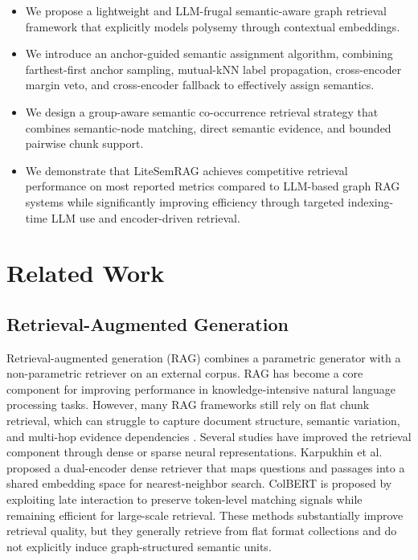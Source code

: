 \documentclass[conference]{IEEEtran}
\begin{document}
\begin{itemize}
    \item We propose a lightweight and LLM-frugal semantic-aware graph retrieval framework that explicitly models polysemy through contextual embeddings.
    \item We introduce an anchor-guided semantic assignment algorithm, combining farthest-first anchor sampling, mutual-kNN label propagation, cross-encoder margin veto, and cross-encoder fallback to effectively assign semantics.
    \item We design a group-aware semantic co-occurrence retrieval strategy that combines semantic-node matching, direct semantic evidence, and bounded pairwise chunk support.
    \item We demonstrate that LiteSemRAG achieves competitive retrieval performance on most reported metrics compared to LLM-based graph RAG systems while significantly improving efficiency through targeted indexing-time LLM use and encoder-driven retrieval.
\end{itemize}


\section{Related Work}

\subsection{Retrieval-Augmented Generation}

Retrieval-augmented generation (RAG) \cite{lewis2020retrieval} combines a parametric generator with a non-parametric retriever on an external corpus. RAG has become a core component for improving performance in knowledge-intensive natural language processing tasks. However, many RAG frameworks still rely on flat chunk retrieval, which can struggle to capture document structure, semantic variation, and multi-hop evidence dependencies \cite{karpukhin2020dense}. Several studies have improved the retrieval component through dense or sparse neural representations. Karpukhin et al. \cite{karpukhin2020dense} proposed a dual-encoder dense retriever that maps questions and passages into a shared embedding space for nearest-neighbor search. ColBERT \cite{khattab2020colbert} is proposed by exploiting late interaction to preserve token-level matching signals while remaining efficient for large-scale retrieval. These methods substantially improve retrieval quality, but they generally retrieve from flat format collections and do not explicitly induce graph-structured semantic units.
\end{document}
